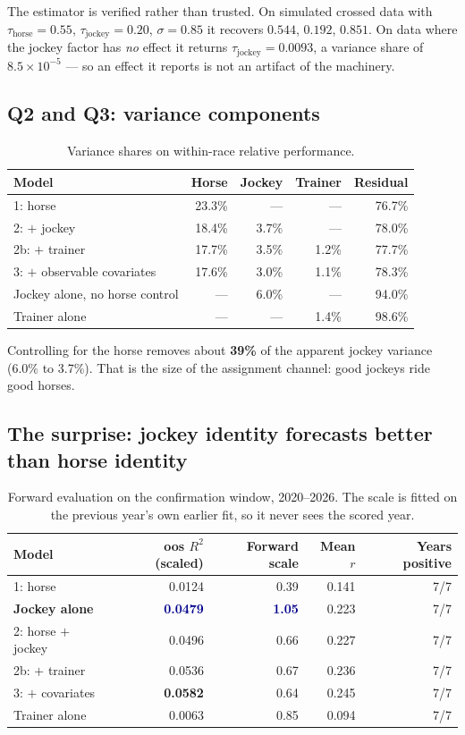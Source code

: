 \documentclass[11pt,a4paper]{article}
\newcommand{\good}[1]{\textcolor{darkblue}{\textbf{#1}}}
\begin{document}
The estimator is verified rather than trusted. On simulated crossed data with
$\tau_{\text{horse}}=0.55$, $\tau_{\text{jockey}}=0.20$, $\sigma=0.85$ it recovers
$0.544$, $0.192$, $0.851$. On data where the jockey factor has \emph{no} effect it
returns $\tau_{\text{jockey}}=0.0093$, a variance share of $8.5\times10^{-5}$ ---
so an effect it reports is not an artifact of the machinery.

\subsection{Q2 and Q3: variance components}

\begin{table}[htbp]\centering\small
\caption{Variance shares on within-race relative performance.}
\begin{tabular}{lrrrr}
\toprule
Model & Horse & Jockey & Trainer & Residual\\
\midrule
1: horse & 23.3\% & --- & --- & 76.7\%\\
2: $+$ jockey & 18.4\% & 3.7\% & --- & 78.0\%\\
2b: $+$ trainer & 17.7\% & 3.5\% & 1.2\% & 77.7\%\\
3: $+$ observable covariates & 17.6\% & 3.0\% & 1.1\% & 78.3\%\\
\midrule
Jockey alone, no horse control & --- & 6.0\% & --- & 94.0\%\\
Trainer alone & --- & --- & 1.4\% & 98.6\%\\
\bottomrule
\end{tabular}
\end{table}

Controlling for the horse removes about \textbf{39\%} of the apparent jockey
variance (6.0\% to 3.7\%). That is the size of the assignment channel: good
jockeys ride good horses.

\subsection{The surprise: jockey identity forecasts better than horse identity}

\begin{table}[htbp]\centering\small
\caption{Forward evaluation on the confirmation window, 2020--2026. The scale is
fitted on the previous year's own earlier fit, so it never sees the scored year.}
\begin{tabular}{lrrrr}
\toprule
Model & oos $R^2$ (scaled) & Forward scale & Mean $r$ & Years positive\\
\midrule
1: horse & 0.0124 & 0.39 & 0.141 & 7/7\\
\textbf{Jockey alone} & \good{0.0479} & \good{1.05} & 0.223 & 7/7\\
2: horse $+$ jockey & 0.0496 & 0.66 & 0.227 & 7/7\\
2b: $+$ trainer & 0.0536 & 0.67 & 0.236 & 7/7\\
3: $+$ covariates & \textbf{0.0582} & 0.64 & 0.245 & 7/7\\
Trainer alone & 0.0063 & 0.85 & 0.094 & 7/7\\
\bottomrule
\end{tabular}
\end{table}
\end{document}
